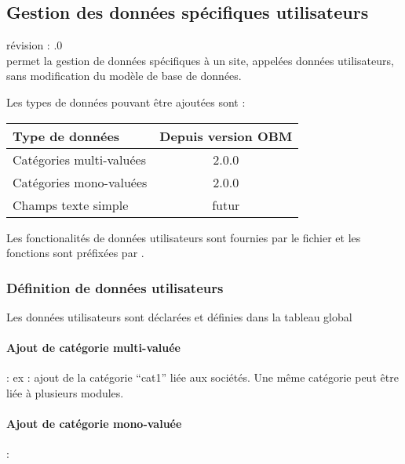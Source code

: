 

\subsection{Gestion des données spécifiques utilisateurs}
\label{of_userdata}
révision : .0\\

\obm permet la gestion de données spécifiques à un site, appelées données utilisateurs, sans modification du modèle de base de données.

Les types de données pouvant être ajoutées sont :\\

\begin{tabular}{|p{8cm}|c|}
\hline
\textbf{Type de données} & \textbf{Depuis version OBM} \\
\hline
Catégories multi-valuées & 2.0.0 \\
\hline
Catégories mono-valuées & 2.0.0 \\
\hline
Champs texte simple & futur \\
\hline
\end{tabular}
\vspace{0.3cm}

Les fonctionalités de données utilisateurs sont fournies par le fichier  et les fonctions sont préfixées par .


\subsubsection{Définition de données utilisateurs}

Les données utilisateurs sont déclarées et définies dans la tableau global 

\paragraph{Ajout de catégorie multi-valuée} : ex : ajout de la catégorie ``cat1'' liée aux sociétés. Une même catégorie peut être liée à plusieurs modules.\\


\paragraph{Ajout de catégorie mono-valuée} : \\

